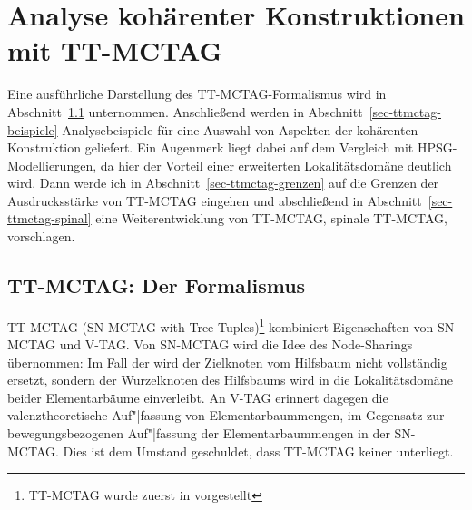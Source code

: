 \chapter{Analyse kohärenter Konstruktionen mit TT-MCTAG}\label{sec-ttmctag}

Eine ausführliche Darstellung des TT-MCTAG-Formalismus wird in Abschnitt~\ref{sec-ttmctag-formalismus} unternommen. Anschlie\ss end werden in Abschnitt~\ref{sec-ttmctag-beispiele} Analysebeispiele für eine Auswahl von Aspekten der kohärenten Konstruktion geliefert. Ein Augenmerk liegt dabei auf dem Vergleich mit HPSG-Modellierungen, da hier der Vorteil einer erweiterten Lokalitätsdomäne deutlich wird. Dann werde ich in Abschnitt~\ref{sec-ttmctag-grenzen} auf die Grenzen der Ausdrucksstärke von TT-MCTAG eingehen und abschlie\ss end in Abschnitt~\ref{sec-ttmctag-spinal} eine Weiterentwicklung von TT-MCTAG, spinale TT-MCTAG, vorschlagen. 

\section{TT-MCTAG: Der Formalismus}\label{sec-ttmctag-formalismus}

TT-MCTAG (SN-MCTAG with Tree Tuples)\footnote{TT-MCTAG wurde zuerst in \cite{Lichte:07} vorgestellt} kombiniert Eigenschaften von SN-MCTAG und V-TAG. Von SN-MCTAG wird die Idee des Node-Sharings übernommen: Im Fall der  wird der Zielknoten vom Hilfsbaum nicht vollständig ersetzt, sondern der Wurzelknoten des Hilfsbaums wird in die Lokalitätsdomäne beider Elementarbäume einverleibt. An V-TAG erinnert dagegen die valenztheoretische Auf"|fassung von Elementarbaummengen, im Gegensatz zur bewegungsbezogenen Auf"|fassung der Elementarbaummengen in der SN-MCTAG. Dies ist dem Umstand geschuldet, dass TT-MCTAG keiner  unterliegt.

